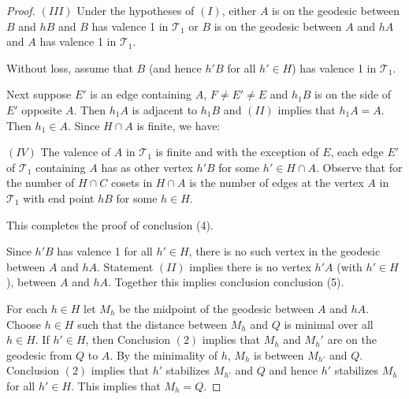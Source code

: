 \documentclass[10pt,a4paper]{amsart}
\begin{document}
\begin{proof}
$(III)$ Under the hypotheses of $(I)$, either $A$ is on the geodesic between $B$ and $hB$ and $B$ has valence 1 in $\mathcal T_1$ or $B$ is on the geodesic between $A$ and $hA$ and $A$ has valence 1 in $\mathcal T_1$. 

Without loss, assume that $B$ (and hence $h'B$ for all $h'\in H$) has valence 1 in $\mathcal T_1$.

\medskip

Next suppose $E'$ is an edge containing $A$, $F\ne E'\ne E$ and $h_1B$ is on the side of $E'$ opposite $A$. Then $h_1A$ is adjacent to $h_1B$ and $(II)$ implies that $h_1A=A$. Then $h_1\in A$. Since $H\cap A$ is finite, we have: 

\medskip

$(IV)$ The valence of $A$ in $\mathcal T_1$ is finite and with the exception of $E$, each edge $E'$ of $\mathcal T_1$ containing $A$ has as other vertex $h'B$ for some $h'\in H\cap A$. Observe that for the number of $H\cap C$ cosets in  $H\cap A$ is the number of edges at the vertex $A$ in $\mathcal T_1$ with end point $hB$ for some $h\in H$. 

\medskip

This completes the proof of conclusion (4).

Since $h'B$ has valence 1 for all $h'\in H$, there is no such vertex in the geodesic between $A$ and $hA$. Statement $(II)$ implies there is no vertex $h'A$ (with $h'\in H$), between $A$ and $hA$. Together this implies conclusion conclusion (5). 

For each $h\in H$ let $M_h$ be the midpoint of the geodesic between $A$ and $hA$. Choose $h\in H$ such that the distance between $M_h$ and $Q$ is minimal over all $h\in H$. If $h'\in H$, then  
Conclusion $(2)$ implies that $M_h$ and $M_h'$ are on the geodesic from  $Q$ to $A$. By the minimality of $h$, $M_{h}$ is between $M_{h'}$ and $Q$. Conclusion $(2)$ implies that $h'$ stabilizes $M_{h'}$ and $Q$ and hence $h'$ stabilizes $M_h$ for all $h'\in H$. This implies that $M_h=Q$. 
\end{proof}
\end{document}
